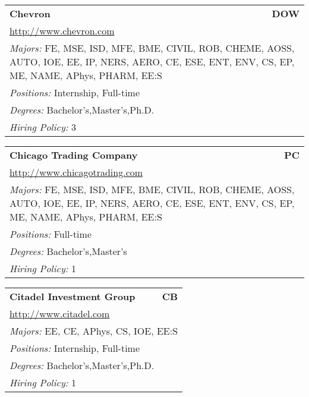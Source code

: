 \documentclass[twoside]{article}
\begin{document}
\begin{center}
\begin{multicols}{3}
\begin{FlushLeft}
\begin{minipage}{\columnwidth}\begin{tabularx}{.95\columnwidth}{Xr}
                 {\Large\bf Chevron} & {\Large\bf DOW}\\
    \multicolumn{2}{p{.95\columnwidth}}{\url{http://www.chevron.com}}\\
    \multicolumn{2}{p{.95\columnwidth}}{\emph{Majors:} FE, MSE, ISD, MFE, BME, CIVIL, ROB, CHEME, AOSS, AUTO, IOE, EE, IP, NERS, AERO, CE, ESE, ENT, ENV, CS, EP, ME, NAME, APhys, PHARM, EE:S}\\
    \multicolumn{2}{p{.95\columnwidth}}{\emph{Positions:} Internship, Full-time}\\
    \multicolumn{2}{p{.95\columnwidth}}{\emph{Degrees:} Bachelor's,Master's,Ph.D.}\\
    \multicolumn{2}{p{.95\columnwidth}}{\emph{Hiring Policy:} 3}\\
    \end{tabularx}
    
\end{minipage}
 
\begin{minipage}{\columnwidth}\begin{tabularx}{.95\columnwidth}{Xr}
                 {\Large\bf Chicago Trading Company} & {\Large\bf PC}\\
    \multicolumn{2}{p{.95\columnwidth}}{\url{http://www.chicagotrading.com}}\\
    \multicolumn{2}{p{.95\columnwidth}}{\emph{Majors:} FE, MSE, ISD, MFE, BME, CIVIL, ROB, CHEME, AOSS, AUTO, IOE, EE, IP, NERS, AERO, CE, ESE, ENT, ENV, CS, EP, ME, NAME, APhys, PHARM, EE:S}\\
    \multicolumn{2}{p{.95\columnwidth}}{\emph{Positions:} Full-time}\\
    \multicolumn{2}{p{.95\columnwidth}}{\emph{Degrees:} Bachelor's,Master's}\\
    \multicolumn{2}{p{.95\columnwidth}}{\emph{Hiring Policy:} 1}\\
    \end{tabularx}
    
\end{minipage}
 
\begin{minipage}{\columnwidth}\begin{tabularx}{.95\columnwidth}{Xr}
                 {\Large\bf Citadel Investment Group} & {\Large\bf CB}\\
    \multicolumn{2}{p{.95\columnwidth}}{\url{http://www.citadel.com}}\\
    \multicolumn{2}{p{.95\columnwidth}}{\emph{Majors:} EE, CE, APhys, CS, IOE, EE:S}\\
    \multicolumn{2}{p{.95\columnwidth}}{\emph{Positions:} Internship, Full-time}\\
    \multicolumn{2}{p{.95\columnwidth}}{\emph{Degrees:} Bachelor's,Master's,Ph.D.}\\
    \multicolumn{2}{p{.95\columnwidth}}{\emph{Hiring Policy:} 1}\\
    \end{tabularx}
    

\end{minipage}
\end{FlushLeft}
\end{multicols}
\end{center}
\end{document}
